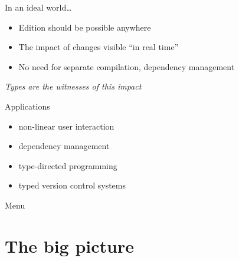 \documentclass[ignorenonframetext,red]{beamer}
\begin{document}
\begin{frame}{In an ideal world\ldots}
  \begin{itemize}
  \item Edition should be possible anywhere
  \item The impact of changes visible “in real time”
  \item No need for separate compilation, dependency management
  \end{itemize}
  \pause
  \vspace{2em}
  \begin{center}
    {\Large \it Types are the witnesses of this impact}
  \end{center}
  \vspace{1em}
  \pause
  \begin{block}{Applications}
    \begin{itemize}
    \item non-linear user interaction
    \item dependency management
    \item type-directed programming
    \item typed version control systems
    \end{itemize}
  \end{block}

\end{frame}

\begin{frame}{Menu}
  \tableofcontents
\end{frame}

\section{The big picture}
\end{document}
